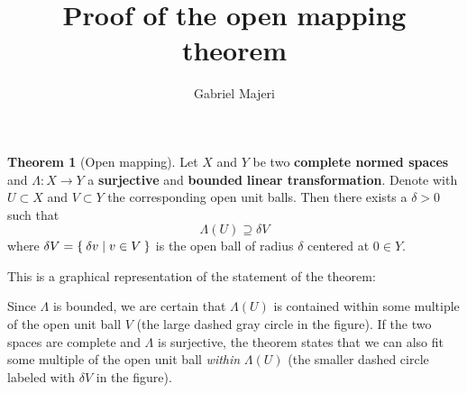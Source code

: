 \documentclass[a4paper, 12pt]{article}
\title{Proof of the open mapping theorem}
\author{Gabriel Majeri}
\date{}
\theoremstyle{definition}
\newtheorem*{theorem}{Theorem}
\begin{document}
\maketitle

\begin{theorem}[Open mapping]
Let \(X\) and \(Y\) be two \textbf{complete normed spaces} and \(\Lambda \colon X \to Y\) a \textbf{surjective} and \textbf{bounded} \textbf{linear transformation}. Denote with \(U \subset X\) and \(V \subset Y\) the corresponding open unit balls. Then there exists a \(\delta > 0\) such that
\[
    \Lambda(U) \supseteq \delta V
\]
where \(\delta V = \Set{ \delta v \mid v \in V }\) is the open ball of radius \(\delta\) centered at \(0 \in Y\).
\end{theorem}

This is a graphical representation of the statement of the theorem:
\begin{figure}[H]
    \centering

\end{figure}

Since \(\Lambda\) is bounded, we are certain that \(\Lambda(U)\) is contained within some multiple of the open unit ball \(V\) (the large dashed gray circle in the figure). If the two spaces are complete and \(\Lambda\) is surjective, the theorem states that we can also fit some multiple of the open unit ball \emph{within} \(\Lambda(U)\) (the smaller dashed circle labeled with \(\delta V\) in the figure).
\end{document}
